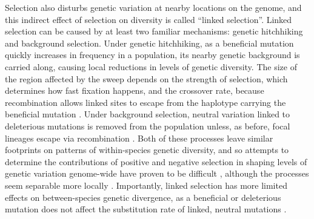 Selection also disturbs genetic variation at nearby locations on the genome,
and this indirect effect of selection on diversity is called ``linked selection''.
Linked selection can be caused by at least two familiar mechanisms: genetic hitchhiking and background selection.
Under genetic hitchhiking, as a beneficial mutation quickly increases in frequency in a population,
its nearby genetic background is carried along, causing local reductions in levels of genetic diversity. 
The size of the region affected by the sweep depends on the strength of selection, which determines how fast fixation happens,
and the crossover rate, because recombination allows linked sites to escape from the haplotype carrying the beneficial mutation \parencite{maynard_smith_hitch-hiking_1974,kaplan_hitchhiking_1989}.
Under background selection, neutral variation linked to deleterious mutations is removed from the population
unless, as before, focal lineages escape via recombination \parencite{charlesworth_effect_1993}.
Both of these processes leave similar footprints on patterns of within-species genetic diversity,
and so attempts to determine the contributions of positive and negative selection in 
shaping levels of genetic variation genome-wide have proven to be difficult \parencite{kim_joint_2000, andolfatto_adaptive_2001},
although the processes seem separable more locally \parencite{schrider_soft_2017,schrider_background_2020}.
Importantly, linked selection has more limited effects on between-species genetic divergence,
as a beneficial or deleterious mutation does not affect the substitution rate of linked, neutral mutations \citep{birky_effects_1988}.



